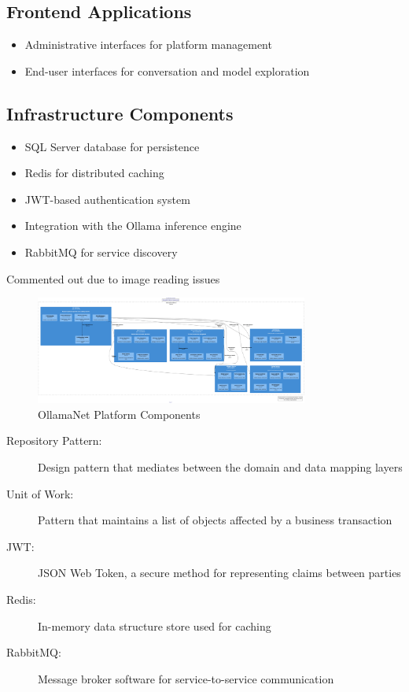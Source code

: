 \subsection{Frontend Applications}
\begin{itemize}
    \item Administrative interfaces for platform management
    \item End-user interfaces for conversation and model exploration
\end{itemize}

\subsection{Infrastructure Components}
\begin{itemize}
    \item SQL Server database for persistence
    \item Redis for distributed caching
    \item JWT-based authentication system
    \item Integration with the Ollama inference engine
    \item RabbitMQ for service discovery
\end{itemize}

Commented out due to image reading issues
\begin{figure}
    \centering
    \includegraphics[width=0.8\textwidth]{./Chapter01/figures/OllamaNet_Platform_Components.png}
    \caption{OllamaNet Platform Components}
    \label{fig:ollamanet-platform-components}
\end{figure}

\begin{terminology}
\begin{description}
    \item[Repository Pattern:] Design pattern that mediates between the domain and data mapping layers
    \item[Unit of Work:] Pattern that maintains a list of objects affected by a business transaction
    \item[JWT:] JSON Web Token, a secure method for representing claims between parties
    \item[Redis:] In-memory data structure store used for caching
    \item[RabbitMQ:] Message broker software for service-to-service communication
\end{description}
\end{terminology}

